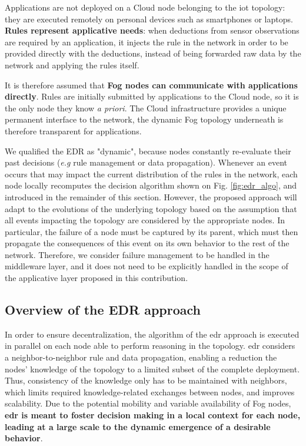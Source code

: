 \documentclass[sw]{iosart2x}
\newcommand{\edr}{EDR\xspace}
\begin{document}
Applications are not deployed on a Cloud node belonging to the \gls{iot} topology: they are executed remotely on personal devices such as smartphones or laptops.
\textbf{Rules represent applicative needs}: when deductions from sensor observations are required by an application, it injects the rule in the network in order to be provided directly with the deductions, instead of being forwarded raw data by the network and applying the rules itself.

It is therefore assumed that \textbf{Fog nodes can communicate with applications directly}.
Rules are initially submitted by applications to the Cloud node, so it is the only node they know \textit{a priori}. 
The Cloud infrastructure provides a unique permanent interface to the network, the dynamic Fog topology underneath is therefore transparent for applications.

We qualified the \edr as "dynamic", because nodes constantly re-evaluate their past decisions (\textit{e.g} rule management or data propagation). 
Whenever an event occurs that may impact the current distribution of the rules in the network, each node locally recomputes the decision algorithm shown on Fig. \ref{fig:edr_algo}, and introduced in the remainder of this section.
However, the proposed approach will adapt to the evolutions of the underlying topology based on the assumption that all events impacting the topology are considered by the appropriate nodes.
In particular, the failure of a node must be captured by its parent, which must then propagate the consequences of this event on its own behavior to the rest of the network.
Therefore, we consider failure management to be handled in the middleware layer, and it does not need to be explicitly handled in the scope of the applicative layer proposed in this contribution.

\subsection{Overview of the EDR approach}
\label{subs:edr_overview}

In order to ensure decentralization, the algorithm of the \gls{edr} approach is executed in parallel on each node able to perform reasoning in the topology. 
\gls{edr} considers a neighbor-to-neighbor rule and data propagation, enabling a reduction the nodes' knowledge of the topology to a limited subset of the complete deployment. 
Thus, consistency of the knowledge only has to be maintained with neighbors, which limits required knowledge-related exchanges between nodes, and improves scalability.
Due to the potential mobility and variable availability of Fog nodes, \textbf{\gls{edr} is meant to foster decision making in a local context for each node, leading at a large scale to the dynamic emergence of a desirable behavior}.
\end{document}

